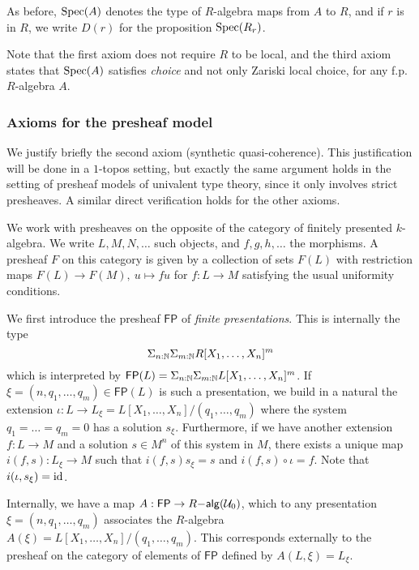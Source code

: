 As before, $\operatorname{Spec}(A)$ denotes the type of $R$-algebra maps from $A$ to $R$, and
if $r$ is in $R$, we write $D(r)$ for the proposition $\operatorname{Spec}(R_r)$.

Note that the first axiom does not require
$R$ to be local, and the third axiom states that $\operatorname{Spec}(A)$ satisfies \emph{choice} and not only Zariski local choice,
for any f.p. $R$-algebra $A$.


\subsubsection{Axioms for the presheaf model}

\newcommand{\FP}{\mathsf{FP}}

We justify briefly the second axiom (synthetic quasi-coherence). This justification will be done
in a $1$-topos setting, but exactly the same argument holds in the setting of presheaf models of
univalent type theory, since it only involves strict presheaves. A similar direct verification holds
for the other axioms.

We work with presheaves on the opposite of the category of finitely presented $k$-algebra. We write
$L,M,N,\dots$ such objects, and $f,g,h,\dots$ the morphisms. A presheaf $F$ on this category is given
by a collection of sets $F(L)$ with restriction maps $F(L)\rightarrow F(M),~u\mapsto f u$ for
$f:L\rightarrow M$ satisfying the usual uniformity conditions.

We first introduce the presheaf $\FP$ of {\em finite presentations}. This is internally the type
$$
\Sigma_{n:\mathbb{N}}\Sigma_{m:\mathbb{N}}R[X_1,\dots,X_n]^m
$$
which is interpreted by $\FP(L) = \Sigma_{n:\nats}\Sigma_{m:\nats}L[X_1,\dots,X_n]^m$.
If $\xi = (n,q_1,\dots,q_m)\in\FP(L)$ is such a presentation, we build in a natural the extension
$\iota:L\rightarrow L_{\xi} = L[X_1,\dots,X_n]/(q_1,\dots,q_m)$ where the system $q_1 = \dots = q_m = 0$
has a solution $s_{\xi}$. Furthermore, if we have another extension $f:L\rightarrow M$
and a solution $s\in M^n$ of this system in $M$, there exists a unique map $i(f,s):L_{\xi}\rightarrow M$
such that $i(f,s) s_{\xi} = s$ and $i(f,s)\circ \iota = f$.
Note that $i(\iota,s_{\xi}) = \mathrm{id}$.

\medskip

Internally, we have a map $A:\FP\rightarrow R\mathsf{-alg}(\UU_0)$, which to any presentation
$\xi = (n,q_1,\dots,q_m)$ associates the $R$-algebra $A(\xi) = L[X_1,\dots,X_n]/(q_1,\dots,q_m)$.
This corresponds externally to the presheaf on the category of elements of $\FP$ defined
by $A(L,\xi) = L_{\xi}$.

